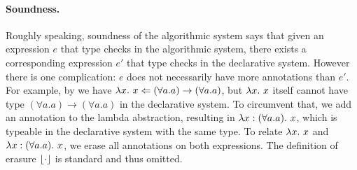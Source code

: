 \paragraph{Soundness.} Roughly speaking, soundness of the algorithmic system says
that given an expression $e$ that type checks in the algorithmic system, there exists
a corresponding expression $e'$ that type checks in the declarative system.
However there is one complication: $e$ does not necessarily have more annotations
than $e'$. For example, by  we have $\lambda {x}.~{x} \Leftarrow (\forall a.
a) \rightarrow (\forall a . a)$, but $\lambda {x}.~{x}$ itself cannot have type
$(\forall a. a) \rightarrow (\forall a . a)$ in the declarative system. To
circumvent that, we add an annotation to the lambda abstraction, resulting in
$\lambda x:(\forall a . a).~{x}$, which is typeable in the declarative system with
the same type. To relate $\lambda {x}.~{x}$ and $\lambda x:(\forall a . a).~{x}$, we
erase all annotations on both expressions. The definition of erasure $\lfloor{\cdot}\rfloor$ is
standard and thus omitted.







